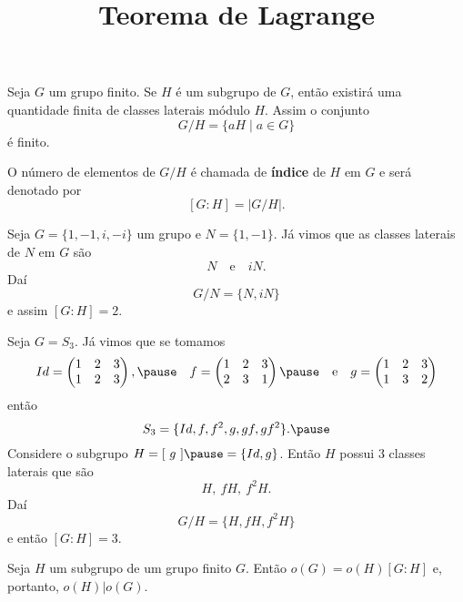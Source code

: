 \documentclass{beamer}
\title{Teorema de Lagrange}
\author[\autor]{\autor}
\institute[\instituto]{\instituto}
\date{}
\begin{document}
    \begin{frame}
        \maketitle
    \end{frame}


    \begin{frame}
        Seja $G$ um grupo finito. Se $H$ é um subgrupo de $G$, então existirá uma quantidade finita de classes laterais módulo $H$.
        Assim o conjunto
        \[
            G/H = \{aH \mid a \in G\}
        \]
        é finito.

        O número de elementos de $G/H$ é chamada de \textbf{índice} de $H$ em $G$ e será denotado por
        \[
            [G : H] = |G/H|.
        \]
    \end{frame}

    \begin{frame}
        \begin{exemplos}[label=({\arabic*})]
            \item Seja $G = \{1, -1, i, -i\}$ um grupo \pause e $N = \{1, -1\}$. Já vimos que as classes laterais de $N$ em $G$ são
            \[
                N \quad \mbox{e}\quad iN.
            \]
            Daí
            \[
                G/N = \{N, iN\}
            \]
            e assim $[G : H] = 2$.

            \vspace{.3cm}

            \item Seja $G = S_3$. \pause J\'a vimos que se tomamos
                \[
                    Id = \begin{pmatrix}
                        1 & 2 & 3\\
                        1 & 2 & 3
                    \end{pmatrix}, \pause\quad
                    f = \begin{pmatrix}
                        1 & 2 & 3\\
                        2 & 3 & 1
                    \end{pmatrix} \pause \quad \mbox{e}\quad
                    g = \begin{pmatrix}
                        1 & 2 & 3\\
                        1 & 3 & 2
                    \end{pmatrix}
                \]
                ent\~ao
                \[
                    S_3 = \{Id, f, f^2, g, gf, gf^2\}. \pause
                \]
                Considere o subgrupo $H = [\ g\ ] \pause = \{Id, g\}$. Então $H$ possui 3 classes laterais que são
                \[
                    H,\ fH,\ f^2H. 
                \]
                Daí
                \[
                    G/H = \{H, fH, f^2H\}
                \]
                e então $[G : H] = 3$.
        \end{exemplos}
    \end{frame}

    \begin{frame}
        \begin{teorema}
            Seja $H$ um subgrupo de um grupo finito $G$. Então $o(G) = o(H)[G:H]$ e, portanto, $o(H) | o(G)$.
        \end{teorema}
    \end{frame}
\end{document}
